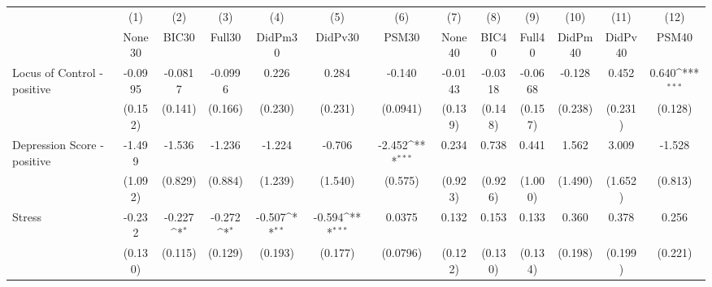 {
\def\sym#1{\ifmmode^{#1}\else\(^{#1}\)\fi}
\begin{tabular}{l*{12}{c}}
\toprule
            &\multicolumn{1}{c}{(1)}&\multicolumn{1}{c}{(2)}&\multicolumn{1}{c}{(3)}&\multicolumn{1}{c}{(4)}&\multicolumn{1}{c}{(5)}&\multicolumn{1}{c}{(6)}&\multicolumn{1}{c}{(7)}&\multicolumn{1}{c}{(8)}&\multicolumn{1}{c}{(9)}&\multicolumn{1}{c}{(10)}&\multicolumn{1}{c}{(11)}&\multicolumn{1}{c}{(12)}\\
            &\multicolumn{1}{c}{None30}&\multicolumn{1}{c}{BIC30}&\multicolumn{1}{c}{Full30}&\multicolumn{1}{c}{DidPm30}&\multicolumn{1}{c}{DidPv30}&\multicolumn{1}{c}{PSM30}&\multicolumn{1}{c}{None40}&\multicolumn{1}{c}{BIC40}&\multicolumn{1}{c}{Full40}&\multicolumn{1}{c}{DidPm40}&\multicolumn{1}{c}{DidPv40}&\multicolumn{1}{c}{PSM40}\\
\midrule
Locus of Control - positive&     -0.0995         &     -0.0817         &     -0.0996         &       0.226         &       0.284         &      -0.140         &     -0.0143         &     -0.0318         &     -0.0668         &      -0.128         &       0.452         &       0.640\sym{***}\\
            &     (0.152)         &     (0.141)         &     (0.166)         &     (0.230)         &     (0.231)         &    (0.0941)         &     (0.139)         &     (0.148)         &     (0.157)         &     (0.238)         &     (0.231)         &     (0.128)         \\
\addlinespace
Depression Score - positive&      -1.499         &      -1.536         &      -1.236         &      -1.224         &      -0.706         &      -2.452\sym{***}&       0.234         &       0.738         &       0.441         &       1.562         &       3.009         &      -1.528         \\
            &     (1.092)         &     (0.829)         &     (0.884)         &     (1.239)         &     (1.540)         &     (0.575)         &     (0.923)         &     (0.926)         &     (1.000)         &     (1.490)         &     (1.652)         &     (0.813)         \\
\addlinespace
Stress      &      -0.232         &      -0.227\sym{*}  &      -0.272\sym{*}  &      -0.507\sym{**} &      -0.594\sym{***}&      0.0375         &       0.132         &       0.153         &       0.133         &       0.360         &       0.378         &       0.256         \\
            &     (0.130)         &     (0.115)         &     (0.129)         &     (0.193)         &     (0.177)         &    (0.0796)         &     (0.122)         &     (0.130)         &     (0.134)         &     (0.198)         &     (0.199)         &     (0.221)         \\

\end{tabular}}
